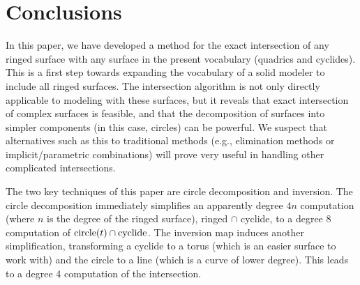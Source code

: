 



%
%
%


% 

\section{Conclusions}
\label{sec:conc}

In this paper, we have developed a method for the exact intersection of any
ringed surface with any surface in the present vocabulary (quadrics and
cyclides).
This is a first step towards expanding the vocabulary 
of a solid modeler to include all ringed surfaces.
The intersection algorithm is not only directly applicable 
to modeling with these surfaces,
but it reveals that exact intersection of complex surfaces is feasible,
and that the decomposition of surfaces into simpler components
(in this case, circles) can be powerful.
We suspect that alternatives such as this to 
traditional methods (e.g., elimination methods or implicit/parametric
combinations) will prove very useful in handling other complicated
intersections.

The two key techniques of this paper are circle decomposition and inversion.
The circle decomposition immediately simplifies an apparently degree $4n$
computation (where $n$ is the degree of the ringed surface),
ringed $\cap$ cyclide, 
to a degree 8 computation of ${\rm circle}(t) \cap {\rm cyclide}$.
The inversion map induces another simplification,
transforming a cyclide to a torus (which is an easier surface to work with)
and the circle to a line (which is a curve of lower degree).
This leads to a degree 4 computation of the intersection.

